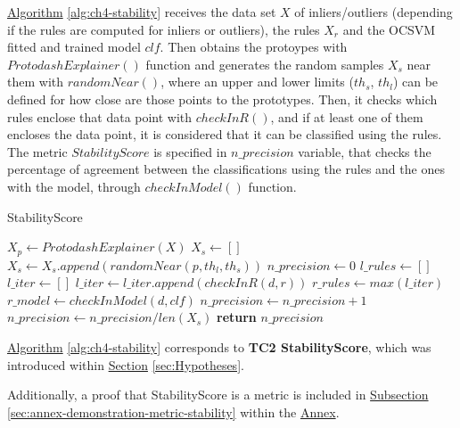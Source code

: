 \hyperref[alg:ch4-stability]{Algorithm} \ref{alg:ch4-stability} receives the data set $X$ of inliers/outliers (depending if the rules are computed for inliers or outliers), the rules $X_r$ and the OCSVM fitted and trained model $clf$. Then obtains the protoypes with $ProtodashExplainer()$ function and generates the random samples $X_s$ near them with $randomNear()$, where an upper and lower limits ($th_s$, $th_l$) can be defined for how close are those points to the prototypes. Then, it checks which rules enclose that data point with $checkInR()$, and if at least one of them encloses the data point, it is considered that it can be classified using the rules. The metric $StabilityScore$ is specified in $n\_precision$ variable, that checks the percentage of agreement between the classifications using the rules and the ones with the model, through $checkInModel()$ function. 

\begin{algorithm}[h!]
\caption{StabilityScore}\label{alg:ch4-stability}
\begin{algorithmic}[1]
    \State $X_p \gets ProtodashExplainer(X)$
    \State $X_s \gets []$
        \State $X_s \gets X_s.append(randomNear(p, th_l, th_s))$
    \EndFor\label{generate_samples}
    \State $n\_precision \gets 0$
    \State $l\_rules \gets []$
        \State $l\_iter \gets []$
             \State $l\_iter \gets l\_iter.append(checkInR(d, r))$
        \EndFor
        \State $r\_rules \gets max(l\_iter)$
        \State $r\_model \gets checkInModel(d, clf)$
            \State $n\_precision \gets n\_precision+1$
        \EndIf\label{compute_agreement}
    \EndFor
    \State $n\_precision \gets n\_precision/len(X_s)$
    \State \textbf{return} $n\_precision$
\EndProcedure
\end{algorithmic}
\end{algorithm}

\hyperref[alg:ch4-stability]{Algorithm} \ref{alg:ch4-stability} corresponds to \textbf{TC2 StabilityScore}, which was introduced within \hyperref[sec:Hypotheses]{Section} \ref{sec:Hypotheses}.

Additionally, a proof that StabilityScore is a metric is included in \hyperref[sec:annex-demonstration-metric-stability]{Subsection} \ref{sec:annex-demonstration-metric-stability} within the \hyperref[ch:annex]{Annex}.

